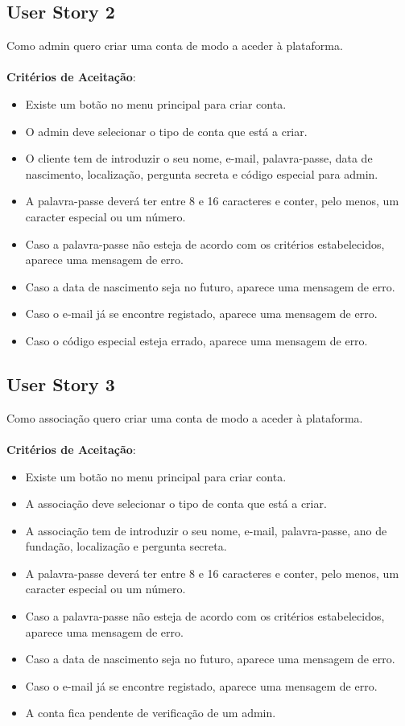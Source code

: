 \documentclass[a4paper,11pt]{article}
\begin{document}
\subsection{User Story 2}
Como admin quero criar uma conta de modo a aceder à plataforma.\\\\
\textbf{Critérios de Aceitação}:
\begin{itemize}
  \item Existe um botão no menu principal para criar conta.
  \item O admin deve selecionar o tipo de conta que está a criar.
  \item O cliente tem de introduzir o seu nome, e-mail, palavra-passe, data de nascimento, localização, pergunta secreta e código especial para admin.
  \item A palavra-passe deverá ter entre 8 e 16 caracteres e conter, pelo menos, um caracter especial ou um número.
  \item Caso a palavra-passe não esteja de acordo com os critérios estabelecidos, aparece uma mensagem de erro.
  \item Caso a data de nascimento seja no futuro, aparece uma mensagem de erro.
  \item Caso o e-mail já se encontre registado, aparece uma mensagem de erro.
  \item Caso o código especial esteja errado, aparece uma mensagem de erro.
\end{itemize}

\subsection{User Story 3}
Como associação quero criar uma conta de modo a aceder à plataforma.\\\\
\textbf{Critérios de Aceitação}:
\begin{itemize}
  \item Existe um botão no menu principal para criar conta.
  \item A associação deve selecionar o tipo de conta que está a criar.
  \item A associação tem de introduzir o seu nome, e-mail, palavra-passe, ano de fundação, localização e pergunta secreta.
  \item A palavra-passe deverá ter entre 8 e 16 caracteres e conter, pelo menos, um caracter especial ou um número.
  \item Caso a palavra-passe não esteja de acordo com os critérios estabelecidos, aparece uma mensagem de erro.
  \item Caso a data de nascimento seja no futuro, aparece uma mensagem de erro.
  \item Caso o e-mail já se encontre registado, aparece uma mensagem de erro.
  \item A conta fica pendente de verificação de um admin.
\end{itemize}
\end{document}

